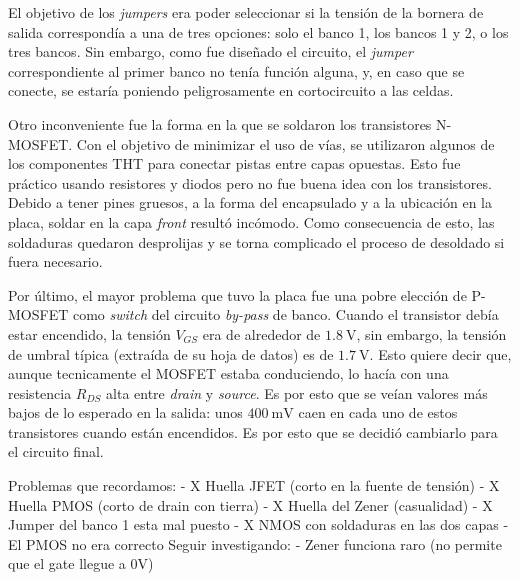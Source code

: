 El objetivo de los \textit{jumpers} era poder seleccionar si la tensión de la bornera de salida correspondía a una de tres opciones: solo el banco 1, los bancos 1 y 2, o los tres bancos. Sin embargo, como fue diseñado el circuito, el \textit{jumper} correspondiente al primer banco no tenía función alguna, y, en caso que se conecte, se estaría poniendo peligrosamente en cortocircuito a las celdas.

Otro inconveniente fue la forma en la que se soldaron los transistores N-MOSFET. Con el objetivo de minimizar el uso de vías, se utilizaron algunos de los componentes THT para conectar pistas entre capas opuestas. Esto fue práctico usando resistores y diodos pero no fue buena idea con los transistores. Debido a tener pines gruesos, a la forma del encapsulado y a la ubicación en la placa, soldar en la capa \textit{front} resultó incómodo. Como consecuencia de esto, las soldaduras quedaron desprolijas y se torna complicado el proceso de desoldado si fuera necesario.

Por último, el mayor problema que tuvo la placa fue una pobre elección de P-MOSFET como \textit{switch} del circuito \textit{by-pass} de banco. Cuando el transistor debía estar encendido, la tensión $V_{GS}$ era de alrededor de $\SI{1.8}{\volt}$, sin embargo, la tensión de umbral típica (extraída de su hoja de datos) es de $\SI{1.7}{\volt}$. Esto quiere decir que, aunque tecnicamente el MOSFET estaba conduciendo, lo hacía con una resistencia $R_{DS}$ alta entre \textit{drain} y \textit{source}. Es por esto que se veían valores más bajos de lo esperado en la salida: unos $\SI{400}{\milli\volt}$ caen en cada uno de estos transistores cuando están encendidos. Es por esto que se decidió cambiarlo para el circuito final.




Problemas que recordamos:
    - X Huella JFET (corto en la fuente de tensión)
    - X Huella PMOS (corto de drain con tierra)
    - X Huella del Zener (casualidad)
    - X Jumper del banco 1 esta mal puesto
    - X NMOS con soldaduras en las dos capas
    - El PMOS no era correcto
Seguir investigando:
    - Zener funciona raro (no permite que el gate llegue a 0V)
            





